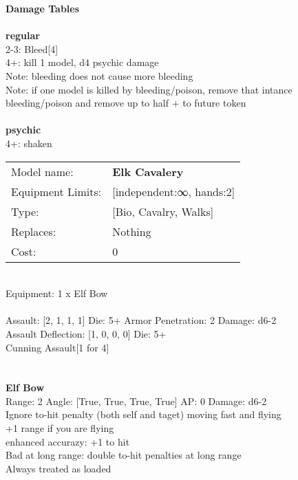 {\bf Damage Tables} \\
\ \\ {\bf regular } \\
2-3: Bleed[4] \\
4+: kill 1 model, d4 psychic damage \\
Note: bleeding does not cause more bleeding \\
Note: if one model is killed by bleeding/poison, remove that intance \\ bleeding/poison and remove up to half + to future token \\
\ \\ {\bf psychic } \\
4+: shaken \\


\noindent
\begin{tabular}{ll}
Model name: &{\bf Elk Cavalery } \\
Equipment Limits: &[independent:∞, hands:2] \\
Type: &[Bio, Cavalry, Walks] \\
Replaces: &Nothing \\
Cost: & 0\\
\end{tabular}
\ \\
Equipment: 1 x Elf Bow \\
\ \\
Assault: [2, 1, 1, 1] Die: 5+ Armor Penetration: 2 Damage: d6-2 \\
Assault Deflection: [1, 0, 0, 0] Die: 5+\\
\indent Cunning Assault[1 for 4]\\ 
 
\ \\

\ \\
{\bf Elf Bow } \\



Range: 2  Angle: [True, True, True, True] AP: 0 Damage: d6-2 \\
Ignore to-hit penalty (both self and taget) moving fast and flying\\ 
+1 range if you are flying\\ 
enhanced accurazy: +1 to hit\\ 
Bad at long range: double to-hit penalties at long range\\ 
Always treated as loaded\\ 




